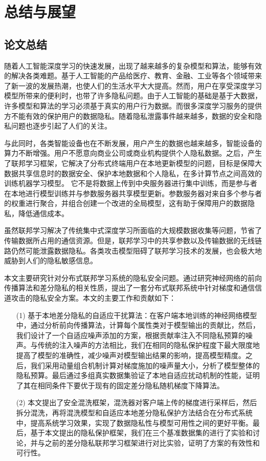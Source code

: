 \chapter{总结与展望}
\label{ch6}
\section{论文总结}
随着人工智能深度学习的快速发展，出现了越来越多的复杂模型和算法，能够有效的解决各类难题。基于人工智能的产品给医疗、教育、金融、工业等各个领域带来了新一波的发展热潮，也使人们的生活水平大大提高。然而，用户在享受深度学习模型所带来的便利时，也带了许多隐私问题。由于人工智能的基础是基于大数据，许多模型和算法的学习必须基于真实的用户行为数据。而很多深度学习服务的提供方不能有效的保护用户的数据隐私。随着隐私泄露事件越来越多，数据的安全和隐私问题也逐步引起了人们的关注。 

与此同时，各类智能设备也在不断发展，用户产生的数据也越来越多，智能设备的算力不断增强。用户不愿意向商业公司或商业机构提供个人隐私数据。之后，产生了联邦学习框架，它解决了分布式终端用户在本地更新模型的问题，目标是保障大数据共享信息时的数据安全、保护本地数据和个人隐私，在多计算节点之间高效的训练机器学习模型。 它不是将数据上传到中央服务器进行集中训练，而是参与者在本地进行模型训练并与参数服务器共享模型更新。参数服务器对来自多个参与者的权重进行聚合，并组合创建一个改进的全局模型，这有助于保障用户的数据隐私，降低通信成本。 

虽然联邦学习解决了传统集中式深度学习所面临的大规模数据收集等问题，节省了传输数据所占用的通信资源。但是，联邦学习中的共享参数以及传输数据的无线链路仍然可能泄露数据隐私。各类攻击模型阻碍了联邦学习技术的发展，也会极大地威胁到人们的隐私敏感信息。

本文主要研究针对分布式联邦学习系统的隐私安全问题。通过研究神经网络的前向传播算法和差分隐私的相关性质，提出了一套分布式联邦系统中针对梯度和通信信道攻击的隐私安全方案。本文的主要工作和贡献如下：
\begin{enumerate}
\item [(1)] 基于本地差分隐私的自适应干扰算法：在客户端本地训练的神经网络模型中，通过分析前向传播算法，计算每个属性类对于模型输出的贡献比，然后，我们设计了一个自适应噪声添加的方案，根据贡献率注入不同隐私预算的噪声。与传统的注入噪声的方法相比，我们在相同的隐私保护程度下最大限度地提高了模型的准确性，减少噪声对模型输出结果的影响，提高模型精度。之后，我们采用动量组合机制计算对梯度施加的噪声量大小，分析了模型整体的隐私预算。最后通过多组真实数据集验证了本地自适应扰动机制的性能，证明了其在相同条件下要优于现有的固定差分隐私随机梯度下降算法。
\item [(2)] 本文提出了安全混洗框架，混洗器对客户端上传的梯度进行采样后，然后拆分混洗，再将混洗模型和自适应本地差分隐私保护方法结合在分布式系统中，提高系统学习效果，实现了数据隐私性与模型可用性之间的更好平衡。最后，基于本文提出的隐私保护框架，我们在三个基准数据集的进行了实验和讨论，并与之前的差分隐私联邦学习框架进行对比实验，证明了方案的有效性和可行性。
\end{enumerate}

